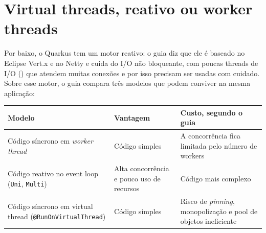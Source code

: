 \section{Virtual threads, reativo ou worker threads}
\label{sec:vt-vs-reativo}

Por baixo, o Quarkus tem um motor reativo: o guia
 diz que ele é baseado no
Eclipse Vert.x e no Netty e cuida do I/O não bloqueante, com poucas
threads de I/O () que atendem muitas conexões
e por isso precisam ser usadas com cuidado. Sobre esse motor, o guia
 compara três modelos que podem
conviver na mesma aplicação:

\small
\begin{longtable}{@{}p{3.6cm} p{4.2cm} p{4.4cm}@{}}
\toprule
Modelo & Vantagem & Custo, segundo o guia \\
\midrule \endhead
Código síncrono em \emph{worker thread} & Código simples & A
  concorrência fica limitada pelo número de workers \\
Código reativo no event loop (\texttt{Uni}, \texttt{Multi}) & Alta
  concorrência e pouco uso de recursos & Código mais complexo \\
Código síncrono em virtual thread (\texttt{@RunOn\-Virtual\-Thread}) &
  Código simples & Risco de \emph{pinning}, monopolização e pool de
  objetos ineficiente \\
\bottomrule
\end{longtable}
\normalsize


